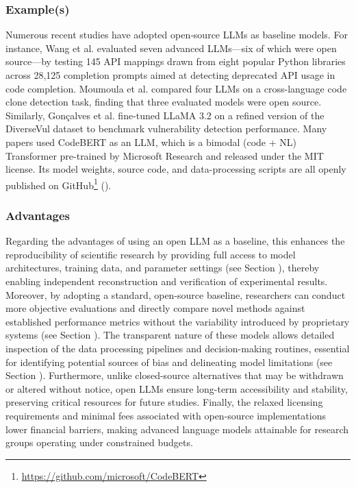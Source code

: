 \subsubsection{Example(s)}

Numerous recent studies have adopted open‐source LLMs as baseline models. For instance, Wang et al. \cite{wang2024and} evaluated seven advanced LLMs—six of which were open source—by testing 145 API mappings drawn from eight popular Python libraries across 28,125 completion prompts aimed at detecting deprecated API usage in code completion. Moumoula et al. \cite{moumoula2024large} compared four LLMs on a cross-language code clone detection task, finding that three evaluated models were open source. Similarly, Gonçalves et al. \cite{gonccalves2025evaluating} fine-tuned LLaMA 3.2 on a refined version of the DiverseVul dataset to benchmark vulnerability detection performance. Many papers \cite{DBLP:journals/jss/YangZCZHC23, DBLP:conf/gaiis/XiaSD24, DBLP:conf/kbse/SonnekalbGBM22, DBLP:conf/icse/CaiYMMN24} used CodeBERT as an LLM, which is a bimodal (code + NL) Transformer pre-trained by Microsoft Research and released under the MIT license. Its model weights, source code, and data-processing scripts are all openly published on GitHub\footnote{\url{https://github.com/microsoft/CodeBERT}} (\modelversion).


\subsubsection{Advantages}

Regarding the advantages of using an open LLM as a baseline, this enhances the reproducibility of scientific research by providing full access to model architectures, training data, and parameter settings (see Section \modelversion), thereby enabling independent reconstruction and verification of experimental results. Moreover, by adopting a standard, open-source baseline, researchers can conduct more objective evaluations and directly compare novel methods against established performance metrics without the variability introduced by proprietary systems (see Section \benchmarksmetrics). The transparent nature of these models allows detailed inspection of the data processing pipelines and decision-making routines, essential for identifying potential sources of bias and delineating model limitations (see Section \limitationsmitigations). Furthermore, unlike closed-source alternatives that may be withdrawn or altered without notice, open LLMs ensure long-term accessibility and stability, preserving critical resources for future studies. Finally, the relaxed licensing requirements and minimal fees associated with open-source implementations lower financial barriers, making advanced language models attainable for research groups operating under constrained budgets.


